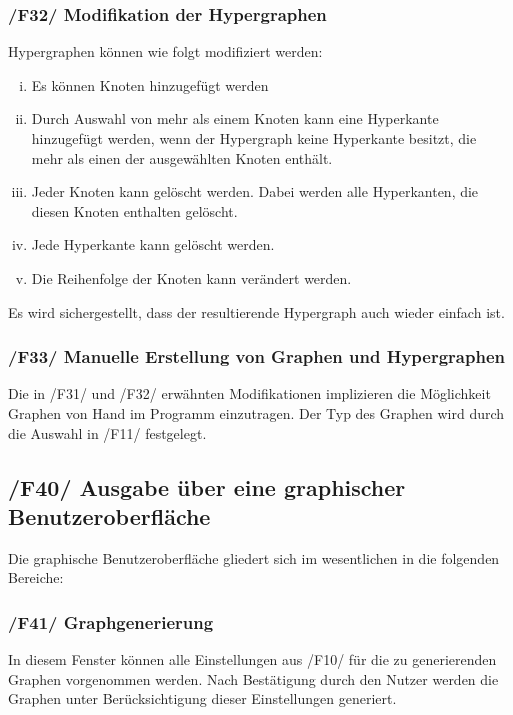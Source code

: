 \documentclass{article}
\begin{document}
	\subsubsection*{/F32/ Modifikation der Hypergraphen} \label{f32} 
	Hypergraphen können wie folgt modifiziert werden:
	\begin{enumerate}[i)]
		\item{Es können Knoten hinzugefügt werden}
		\item{Durch Auswahl von mehr als einem Knoten kann eine Hyperkante hinzugefügt werden, wenn der Hypergraph keine Hyperkante besitzt, die mehr als einen der ausgewählten Knoten enthält.}
		\item{Jeder Knoten kann gelöscht werden. Dabei werden alle Hyperkanten, die diesen Knoten enthalten gelöscht.}
		\item{Jede Hyperkante kann gelöscht werden.}
		\item{Die Reihenfolge der Knoten kann verändert werden.}
	\end{enumerate}
	Es wird sichergestellt, dass der resultierende Hypergraph auch wieder einfach ist.
	
	\subsubsection*{/F33/ Manuelle Erstellung von Graphen und Hypergraphen} \label{f33} 
	Die in /F31/ und /F32/ erwähnten Modifikationen implizieren die Möglichkeit Graphen von Hand im Programm einzutragen. Der Typ des Graphen wird durch die Auswahl in /F11/ festgelegt.
	\newpage
	
	\subsection*{/F40/ Ausgabe über eine graphischer Benutzeroberfläche} \label{f40} 
	Die graphische Benutzeroberfläche gliedert sich im wesentlichen in die folgenden Bereiche:
	
	\subsubsection*{/F41/ Graphgenerierung} \label{f51} 
	In diesem Fenster können alle Einstellungen aus /F10/ für die zu generierenden Graphen vorgenommen werden. Nach Bestätigung durch den Nutzer werden die Graphen unter Berücksichtigung dieser Einstellungen generiert.
	
\end{document}
